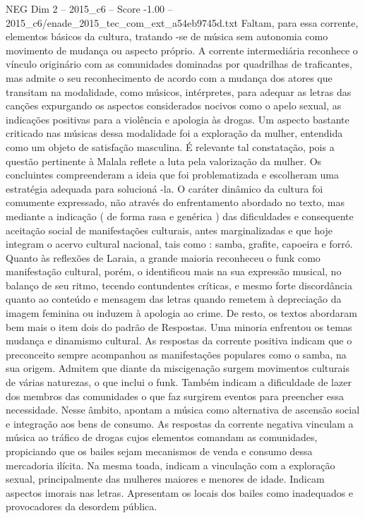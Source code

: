 \begin{textsample}{NEG Dim 2 – 2015\_c6 – Score -1.00 – 2015\_c6/enade\_2015\_tec\_com\_ext\_a54eb9745d.txt}
Faltam, para essa corrente, elementos básicos da cultura, tratando -se de música sem autonomia como movimento de mudança ou aspecto próprio.
A corrente intermediária reconhece o vínculo originário com as comunidades dominadas por quadrilhas de traficantes, mas admite o seu reconhecimento de acordo com a mudança dos atores que transitam na modalidade, como músicos, intérpretes, para adequar as letras das canções expurgando os aspectos considerados nocivos como o apelo sexual, as indicações positivas para a violência e apologia às drogas.
Um aspecto bastante criticado nas músicas dessa modalidade foi a exploração da mulher, entendida como um objeto de satisfação masculina.
É relevante tal constatação, pois a questão pertinente à Malala reflete a luta pela valorização da mulher.
Os concluintes compreenderam a ideia que foi problematizada e escolheram uma estratégia adequada para solucioná -la.
O caráter dinâmico da cultura foi comumente expressado, não através do enfrentamento abordado no texto, mas mediante a indicação ( de forma rasa e genérica ) das dificuldades e consequente aceitação social de manifestações culturais, antes marginalizadas e que hoje integram o acervo cultural nacional, tais como : samba, grafite, capoeira e forró.
Quanto às reflexões de Laraia, a grande maioria reconheceu o funk como manifestação cultural, porém, o identificou mais na sua expressão musical, no balanço de seu ritmo, tecendo contundentes críticas, e mesmo forte discordância quanto ao conteúdo e mensagem das letras quando remetem à depreciação da imagem feminina ou induzem à apologia ao crime.
De resto, os textos abordaram bem mais o item dois do padrão de Respostas.
Uma minoria enfrentou os temas mudança e dinamismo cultural.
As respostas da corrente positiva indicam que o preconceito sempre acompanhou as manifestações populares como o samba, na sua origem.
Admitem que diante da miscigenação surgem movimentos culturais de várias naturezas, o que inclui o funk.
Também indicam a dificuldade de lazer dos membros das comunidades o que faz surgirem eventos para preencher essa necessidade.
Nesse âmbito, apontam a música como alternativa de ascensão social e integração aos bens de consumo.
As respostas da corrente negativa vinculam a música ao tráfico de drogas cujos elementos comandam as comunidades, propiciando que os bailes sejam mecanismos de venda e consumo dessa mercadoria ilícita.
Na mesma toada, indicam a vinculação com a exploração sexual, principalmente das mulheres maiores e menores de idade.
Indicam aspectos imorais nas letras.
Apresentam os locais dos bailes como inadequados e provocadores da desordem pública.

\end{textsample}
